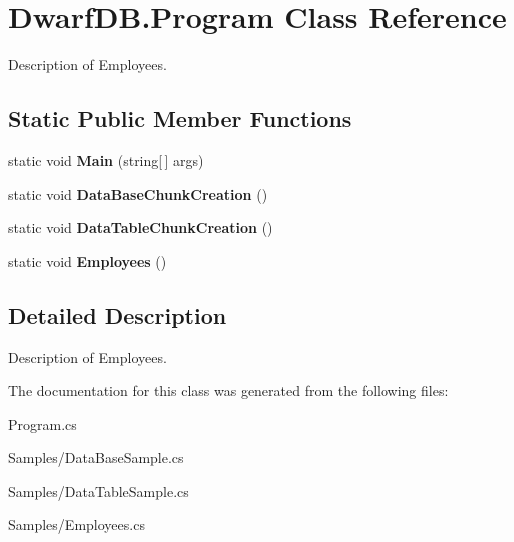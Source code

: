 \hypertarget{class_dwarf_d_b_1_1_program}{
\section{DwarfDB.Program Class Reference}
\label{class_dwarf_d_b_1_1_program}
}


Description of Employees.  


\subsection*{Static Public Member Functions}
\begin{DoxyCompactItemize}
\item 
\hypertarget{class_dwarf_d_b_1_1_program_ad191792c625399b2912062074ad4476b}{
static void {\bfseries Main} (string\mbox{[}$\,$\mbox{]} args)}
\label{class_dwarf_d_b_1_1_program_ad191792c625399b2912062074ad4476b}

\item 
\hypertarget{class_dwarf_d_b_1_1_program_af6bc5554955f41aa161cd638dd1fcbc1}{
static void {\bfseries DataBaseChunkCreation} ()}
\label{class_dwarf_d_b_1_1_program_af6bc5554955f41aa161cd638dd1fcbc1}

\item 
\hypertarget{class_dwarf_d_b_1_1_program_abab621dfeced1fb0c770bd5a1dffe3a6}{
static void {\bfseries DataTableChunkCreation} ()}
\label{class_dwarf_d_b_1_1_program_abab621dfeced1fb0c770bd5a1dffe3a6}

\item 
\hypertarget{class_dwarf_d_b_1_1_program_a59b46f2c792386b7eaaf5419cd7656a0}{
static void {\bfseries Employees} ()}
\label{class_dwarf_d_b_1_1_program_a59b46f2c792386b7eaaf5419cd7656a0}

\end{DoxyCompactItemize}


\subsection{Detailed Description}
Description of Employees. 

The documentation for this class was generated from the following files:\begin{DoxyCompactItemize}
\item 
Program.cs\item 
Samples/DataBaseSample.cs\item 
Samples/DataTableSample.cs\item 
Samples/Employees.cs\end{DoxyCompactItemize}
